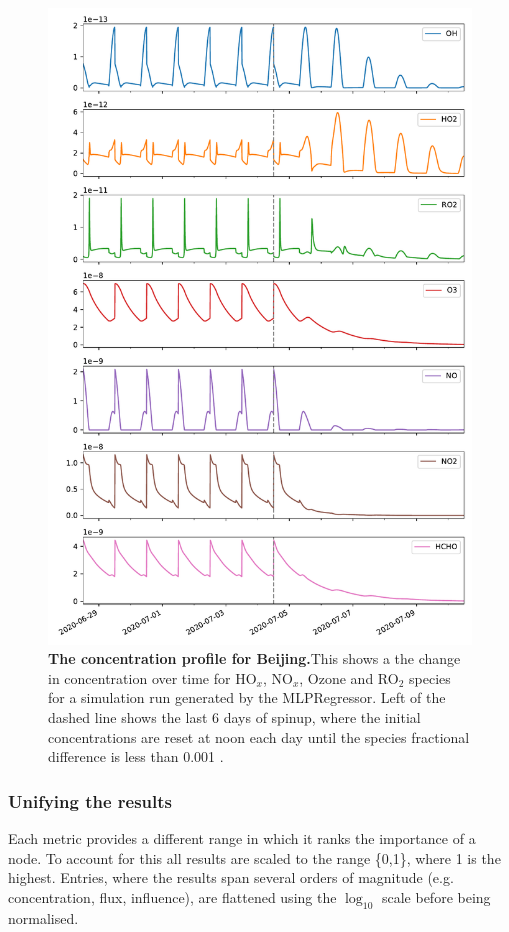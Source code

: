 \begin{figure}[H]
    \centering
\includegraphics[width=.9\textwidth]{figures_c3/mlpregressor/conc_beijing.pdf}
\caption{\textbf{The concentration profile for Beijing.}This shows a the change in concentration over time for HO$_x$, NO$_x$, Ozone and RO$_2$ species for a simulation run generated by the MLPRegressor. Left of the dashed line shows the last 6 days of spinup, where the initial concentrations are reset at noon each day until the species fractional difference is less than 0.001 .}\label{fig:cbeijing}
\end{figure}

\newpage





\subsubsection{Unifying the results}
Each metric provides a different range in which it ranks the importance of a node. To account for this all results are scaled to the range \{0,1\}, where 1 is the highest. Entries, where the results span several orders of magnitude (e.g. concentration, flux, influence), are flattened using the $\log_{10}$ scale before being normalised. 



